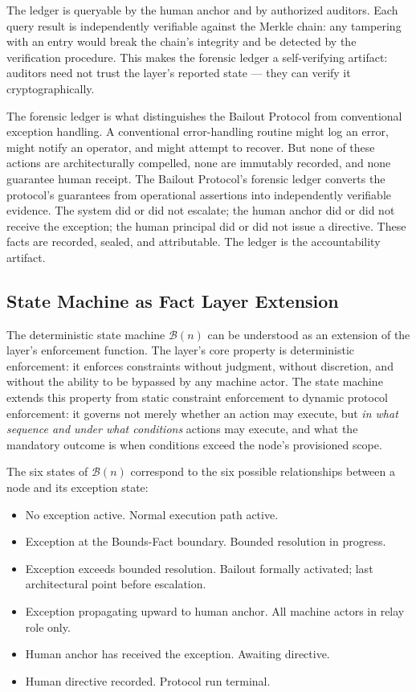 The ledger is queryable by the human anchor and by authorized auditors. Each query result is independently verifiable against the Merkle chain: any tampering with an entry would break the chain's integrity and be detected by the verification procedure. This makes the forensic ledger a self-verifying artifact: auditors need not trust the \fact{} layer's reported state --- they can verify it cryptographically.

The forensic ledger is what distinguishes the Bailout Protocol from conventional exception handling. A conventional error-handling routine might log an error, might notify an operator, and might attempt to recover. But none of these actions are architecturally compelled, none are immutably recorded, and none guarantee human receipt. The Bailout Protocol's forensic ledger converts the protocol's guarantees from operational assertions into independently verifiable evidence. The system did or did not escalate; the human anchor did or did not receive the exception; the human principal did or did not issue a directive. These facts are recorded, sealed, and attributable. The ledger is the accountability artifact.

\subsection{State Machine as Fact Layer Extension}
\label{sec:state-machine-fact-extension}

The deterministic state machine $\mathcal{B}(n)$ can be understood as an extension of the \fact{} layer's enforcement function. The \fact{} layer's core property is deterministic enforcement: it enforces constraints without judgment, without discretion, and without the ability to be bypassed by any machine actor. The state machine extends this property from static constraint enforcement to dynamic protocol enforcement: it governs not merely whether an action may execute, but \emph{in what sequence and under what conditions} actions may execute, and what the mandatory outcome is when conditions exceed the node's provisioned scope.

The six states of $\mathcal{B}(n)$ correspond to the six possible relationships between a node and its exception state:

\begin{itemize}\itemsep=0pt
  \item[IDLE:] No exception active. Normal execution path active.
  \item[BOUNDED:] Exception at the Bounds-Fact boundary. Bounded resolution in progress.
  \item[BAIL\_PENDING:] Exception exceeds bounded resolution. Bailout formally activated; last architectural point before escalation.
  \item[ESCALATING:] Exception propagating upward to human anchor. All machine actors in relay role only.
  \item[HUMAN\_ACKNOWLEDGED:] Human anchor has received the exception. Awaiting directive.
  \item[RESOLVED:] Human directive recorded. Protocol run terminal.
\end{itemize}

